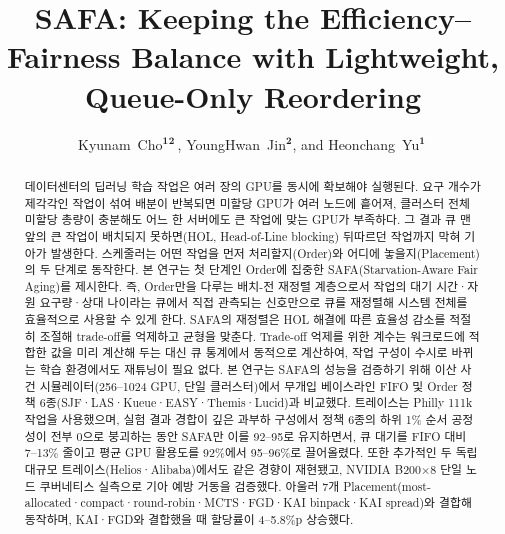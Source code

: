 \documentclass{ieeetj}
\def\authorrefmark#1{\ensuremath{^{\textbf{#1}}}}
\begin{document}


\title{SAFA: Keeping the Efficiency--Fairness Balance with Lightweight, Queue-Only Reordering}

\author{Kyunam~Cho\authorrefmark{1}\authorrefmark{2}\,, YoungHwan~Jin\authorrefmark{2}, and Heonchang~Yu\authorrefmark{1}\,}

\begin{abstract}
데이터센터의 딥러닝 학습 작업은 여러 장의 GPU를 동시에 확보해야 실행된다. 요구 개수가 제각각인 작업이 섞여 배분이 반복되면 미할당 GPU가 여러 노드에 흩어져, 클러스터 전체 미할당 총량이 충분해도 어느 한 서버에도 큰 작업에 맞는 GPU가 부족하다. 그 결과 큐 맨 앞의 큰 작업이 배치되지 못하면(HOL, Head-of-Line blocking) 뒤따르던 작업까지 막혀 기아가 발생한다. 스케줄러는 어떤 작업을 먼저 처리할지(Order)와 어디에 놓을지(Placement)의 두 단계로 동작한다. 본 연구는 첫 단계인 Order에 집중한 SAFA(Starvation-Aware Fair Aging)를 제시한다. 즉, Order만을 다루는 배치-전 재정렬 계층으로서 작업의 대기 시간·자원 요구량·상대 나이라는 큐에서 직접 관측되는 신호만으로 큐를 재정렬해 시스템 전체를 효율적으로 사용할 수 있게 한다. SAFA의 재정렬은 HOL 해결에 따른 효율성 감소를 적절히 조절해 trade-off를 억제하고 균형을 맞춘다. Trade-off 억제를 위한 계수는 워크로드에 적합한 값을 미리 계산해 두는 대신 큐 통계에서 동적으로 계산하여, 작업 구성이 수시로 바뀌는 학습 환경에서도 재튜닝이 필요 없다. 본 연구는 SAFA의 성능을 검증하기 위해 이산 사건 시뮬레이터(256--1024 GPU, 단일 클러스터)에서 무개입 베이스라인 FIFO 및 Order 정책 6종(SJF·LAS·Kueue·EASY·Themis·Lucid)과 비교했다. 트레이스는 Philly 111k 작업을 사용했으며, 실험 결과 경합이 깊은 과부하 구성에서 정책 6종의 하위 1\% 순서 공정성이 전부 0으로 붕괴하는 동안 SAFA만 이를 92--95로 유지하면서, 큐 대기를 FIFO 대비 7--13\% 줄이고 평균 GPU 활용도를 92\%에서 95--96\%로 끌어올렸다. 또한 추가적인 두 독립 대규모 트레이스(Helios·Alibaba)에서도 같은 경향이 재현됐고, NVIDIA B200$\times$8 단일 노드 쿠버네티스 실측으로 기아 예방 거동을 검증했다. 아울러 7개 Placement(most-allocated·compact·round-robin·MCTS·FGD·KAI binpack·KAI spread)와 결합해 동작하며, KAI·FGD와 결합했을 때 할당률이 4--5.8\%p 상승했다.
\end{abstract}
\end{document}
